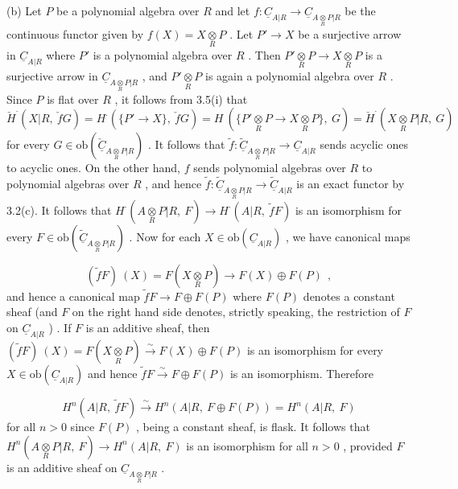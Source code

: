 (b)  Let  $P$  be a polynomial algebra over  $R$  and  let $f : \underline{C}_{A|R} \to \underline{C}_{A\underset{R}{\otimes}P|R}$  be the continuous functor given by  $f(X) = X\underset{R}{\otimes}P$ . Let  $P' \to X$ be a surjective arrow in  $\underline{C}_{A|R}$  where  $P'$  is a polynomial algebra over  $R$ . Then $P'\underset{R}{\otimes}P \to X\underset{R}{\otimes}P$  is a surjective arrow in  $\underline{C}_{A\underset{R}{\otimes}P|R}$ , and  $P'\underset{R}{\otimes}P$  is again a polynomial algebra over  $R$ . Since  $P$  is flat over  $R$ , it follows from 3.5(i) that $\check{H}^{\cdot}(X|R,\ \check{f}G) = H^{\cdot}(\{P' \to X\},\ \check{f}G) = H\ (\{P'\underset{R}{\otimes}P \to X\underset{R}{\otimes}P\},\ G) = \check{H}^{\cdot}(X\underset{R}{\otimes}P|R,\ G)$ for every  $G \in \mathrm{ob}(\underline{\check{C}}_{A\underset{R}{\otimes}P|R})$ . It follows that  $\widetilde{f} : \underline{\widetilde{C}}_{A\underset{R}{\otimes}P|R} \to \underline{C}_{A|R}$  sends acyclic ones to acyclic ones. On the other hand,  $f$  sends polynomial algebras over  $R$  to polynomial algebras over  $R$ , and hence  $\widetilde{f} : \underline{\widetilde{C}}_{A\underset{R}{\otimes}P|R} \to\!\underline{\widetilde{C}}_{A|R}$  is an exact functor by 3.2(c). It follows that  $H^{\cdot}(A\underset{R}{\otimes}P|R,\ F) \to H^{\cdot}(A|R,\ \widetilde{f}F)$  is an isomorphism for every $F \in \mathrm{ob}(\underline{\widetilde{C}}_{A\underset{R}{\otimes}P|R})$ . Now for each  $X \in \mathrm{ob}(\underline{C}_{A|R})$ , we have canonical maps

\begin{equation*}
(\widetilde{f}F)\ (X) = F(X\underset{R}{\otimes}P) \to F(X)\oplus F(P)\ \ ,
\end{equation*}
and hence a canonical map  $\widetilde{f}F \to F\oplus F(P)$  where  $F(P)$  denotes a constant sheaf (and  $F$  on the right hand side denotes, strictly speaking, the restriction of  $F$ on  $\underline{C}_{A|R}$ ) . If  $F$  is an additive sheaf, then  $(\widetilde{f}F)\ (X) = F(X\underset{R}{\otimes}P) \overset{\sim}{\to} F(X)\oplus F(P)$ is an isomorphism for every  $X \in \mathrm{ob}(\underline{C}_{A|R})$  and hence  $\widetilde{f}F \overset{\sim}{\to} F\oplus F(P)$  is an isomorphism. Therefore 



\begin{equation*}
 H^{n}(A|R,\ \widetilde{f}F) \overset{\sim}{\to} H^{n}(A|R,\ F\oplus F(P)) = H^{n}(A|R,\ F)
\end{equation*}
for all  $n > 0$  since  $F(P)$ , being a constant sheaf, is flask. It follows that $H^{n}(A\underset{R}{\otimes}P|R,\ F) \to H^{n}(A|R,\ F)$  is an isomorphism for all  $n > 0$ , provided  $F$  is an additive sheaf on  $\underline{C}_{A\underset{R}{\otimes}P|R}$ .

